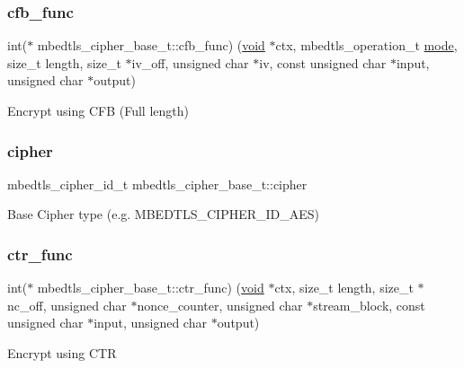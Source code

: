 \subsubsection{\texorpdfstring{cfb\+\_\+func}{cfb\_func}}
{\footnotesize\ttfamily int($\ast$ mbedtls\+\_\+cipher\+\_\+base\+\_\+t\+::cfb\+\_\+func) (\hyperlink{interfacevoid}{void} $\ast$ctx, mbedtls\+\_\+operation\+\_\+t \hyperlink{interfacevoid}{mode}, size\+\_\+t length, size\+\_\+t $\ast$iv\+\_\+off, unsigned char $\ast$iv, const unsigned char $\ast$input, unsigned char $\ast$output)}

Encrypt using C\+FB (Full length) \mbox{\label{structmbedtls__cipher__base__t_a0c4c819c23b0a579445f92a4bee7d577}} 
\subsubsection{\texorpdfstring{cipher}{cipher}}
{\footnotesize\ttfamily mbedtls\+\_\+cipher\+\_\+id\+\_\+t mbedtls\+\_\+cipher\+\_\+base\+\_\+t\+::cipher}

Base Cipher type (e.\+g. M\+B\+E\+D\+T\+L\+S\+\_\+\+C\+I\+P\+H\+E\+R\+\_\+\+I\+D\+\_\+\+A\+ES) \mbox{\label{structmbedtls__cipher__base__t_ac3d68fe4b133c56acb5b05029b8f60ea}} 
\subsubsection{\texorpdfstring{ctr\+\_\+func}{ctr\_func}}
{\footnotesize\ttfamily int($\ast$ mbedtls\+\_\+cipher\+\_\+base\+\_\+t\+::ctr\+\_\+func) (\hyperlink{interfacevoid}{void} $\ast$ctx, size\+\_\+t length, size\+\_\+t $\ast$nc\+\_\+off, unsigned char $\ast$nonce\+\_\+counter, unsigned char $\ast$stream\+\_\+block, const unsigned char $\ast$input, unsigned char $\ast$output)}

Encrypt using C\+TR \mbox{\label{structmbedtls__cipher__base__t_a95b0567a8a1644bc9325d08f74bbca99}} 

